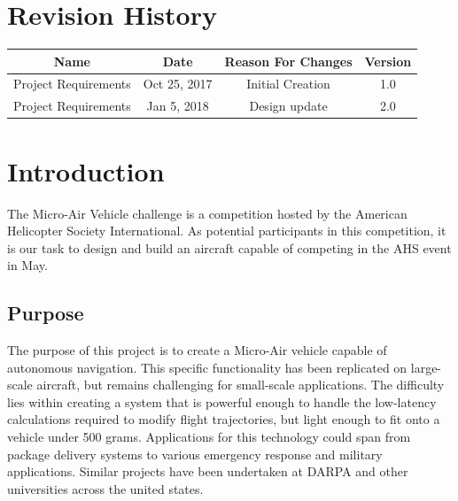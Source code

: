 \documentclass[onecolumn, draftclsnofoot,10pt, compsoc]{IEEEtran}
\begin{document}
\section*{Revision History}

\begin{center}
    \begin{tabular}{|c|c|c|c|}
        \hline
	    Name & Date & Reason For Changes & Version\\
        \hline
	    Project Requirements & Oct 25, 2017 & Initial Creation & 1.0\\
        \hline
		Project Requirements & Jan 5, 2018 & Design update & 2.0\\
        \hline
    \end{tabular}
\end{center}


\section{Introduction}

The Micro-Air Vehicle challenge is a competition hosted by the American Helicopter Society International. As potential participants in this competition, it is our task to design and build an aircraft capable of competing in the AHS event in May.

\subsection{Purpose}

The purpose of this project is to create a Micro-Air vehicle capable of autonomous navigation. This specific functionality has been replicated on large-scale aircraft, but remains challenging for small-scale applications. The difficulty lies within creating a system that is powerful enough to handle the low-latency calculations required to modify flight trajectories, but light enough to fit onto a vehicle under 500 grams. Applications for this technology could span from package delivery systems to various emergency response and military applications. Similar projects have been undertaken at DARPA \cite{r1} and other universities across the united states.
\end{document}
